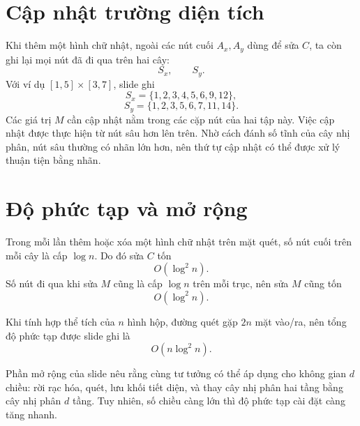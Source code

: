 \documentclass[11pt]{article}
\begin{document}
\section{Cập nhật trường diện tích}

Khi thêm một hình chữ nhật, ngoài các nút cuối \(A_x,A_y\) dùng để sửa
\(C\), ta còn ghi lại mọi nút đã đi qua trên hai cây:
\[
  S_x,\qquad S_y.
\]
Với ví dụ \([1,5]\times[3,7]\), slide ghi
\[
  S_x=\{1,2,3,4,5,6,9,12\},
\]
\[
  S_y=\{1,2,3,5,6,7,11,14\}.
\]
Các giá trị \(M\) cần cập nhật nằm trong các cặp nút của hai tập này. Việc
cập nhật được thực hiện từ nút sâu hơn lên trên. Nhờ cách đánh số tĩnh của
cây nhị phân, nút sâu thường có nhãn lớn hơn, nên thứ tự cập nhật có thể
được xử lý thuận tiện bằng nhãn.

\section{Độ phức tạp và mở rộng}

Trong mỗi lần thêm hoặc xóa một hình chữ nhật trên mặt quét, số nút cuối trên
mỗi cây là cấp \(\log n\). Do đó sửa \(C\) tốn
\[
  O(\log^2 n).
\]
Số nút đi qua khi sửa \(M\) cũng là cấp \(\log n\) trên mỗi trục, nên sửa
\(M\) cũng tốn
\[
  O(\log^2 n).
\]

Khi tính hợp thể tích của \(n\) hình hộp, đường quét gặp \(2n\) mặt vào/ra,
nên tổng độ phức tạp được slide ghi là
\[
  O(n\log^2 n).
\]

Phần mở rộng của slide nêu rằng cùng tư tưởng có thể áp dụng cho không gian
\(d\) chiều: rời rạc hóa, quét, lưu khối tiết diện, và thay cây nhị phân hai
tầng bằng cây nhị phân \(d\) tầng. Tuy nhiên, số chiều càng lớn thì độ phức
tạp cài đặt càng tăng nhanh.
\end{document}
